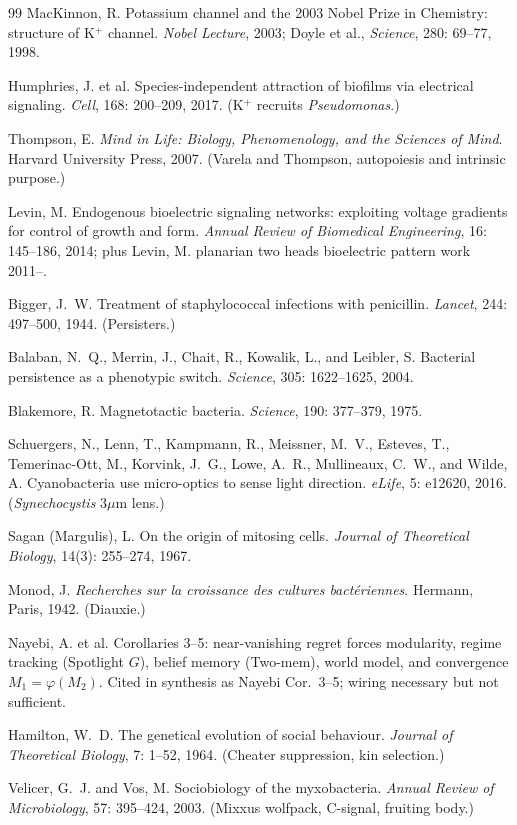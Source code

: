 \documentclass[11pt,a4paper]{article}
\begin{document}
\begin{thebibliography}{99}
MacKinnon, R.
Potassium channel and the 2003 Nobel Prize in Chemistry: structure of K$^+$ channel.
\textit{Nobel Lecture}, 2003; Doyle et al., \textit{Science}, 280: 69--77, 1998.

Humphries, J. et al.
Species-independent attraction of biofilms via electrical signaling.
\textit{Cell}, 168: 200--209, 2017. (K$^+$ recruits \textit{Pseudomonas}.)

Thompson, E.
\textit{Mind in Life: Biology, Phenomenology, and the Sciences of Mind}.
Harvard University Press, 2007. (Varela and Thompson, autopoiesis and intrinsic purpose.)

Levin, M.
Endogenous bioelectric signaling networks: exploiting voltage gradients for control of growth and form.
\textit{Annual Review of Biomedical Engineering}, 16: 145--186, 2014; plus Levin, M. planarian two heads bioelectric pattern work 2011--.

Bigger, J.~W.
Treatment of staphylococcal infections with penicillin.
\textit{Lancet}, 244: 497--500, 1944. (Persisters.)

Balaban, N.~Q., Merrin, J., Chait, R., Kowalik, L., and Leibler, S.
Bacterial persistence as a phenotypic switch.
\textit{Science}, 305: 1622--1625, 2004.

Blakemore, R.
Magnetotactic bacteria.
\textit{Science}, 190: 377--379, 1975.

Schuergers, N., Lenn, T., Kampmann, R., Meissner, M.~V., Esteves, T., Temerinac-Ott, M., Korvink, J.~G., Lowe, A.~R., Mullineaux, C.~W., and Wilde, A.
Cyanobacteria use micro-optics to sense light direction.
\textit{eLife}, 5: e12620, 2016. (\textit{Synechocystis} $3\mu$m lens.)

Sagan (Margulis), L.
On the origin of mitosing cells.
\textit{Journal of Theoretical Biology}, 14(3): 255--274, 1967.

Monod, J.
\textit{Recherches sur la croissance des cultures bact\'{e}riennes}.
Hermann, Paris, 1942. (Diauxie.)

Nayebi, A. et al.
Corollaries 3--5: near-vanishing regret forces modularity, regime tracking (Spotlight $G$), belief memory (Two-mem), world model, and convergence $M_1 = \varphi(M_2)$.
Cited in synthesis as Nayebi Cor.~3--5; wiring necessary but not sufficient.

Hamilton, W.~D.
The genetical evolution of social behaviour.
\textit{Journal of Theoretical Biology}, 7: 1--52, 1964. (Cheater suppression, kin selection.)

Velicer, G.~J. and Vos, M.
Sociobiology of the myxobacteria.
\textit{Annual Review of Microbiology}, 57: 395--424, 2003. (Mixxus wolfpack, C-signal, fruiting body.)

\end{thebibliography}
\end{document}
